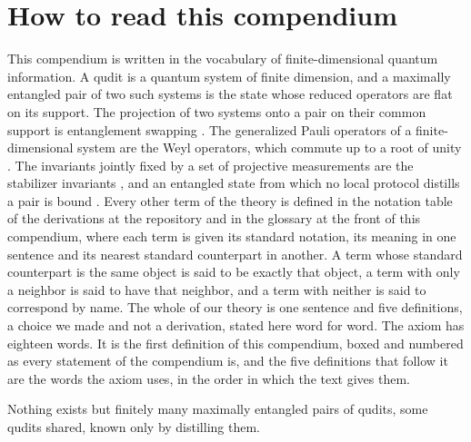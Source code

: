 \section{How to read this compendium}\label{mod:FRAMEWORK}
This compendium is written in the vocabulary of finite-dimensional quantum information. A qudit is a quantum system of finite dimension, and a maximally entangled pair of two such systems is the state whose reduced operators are flat on its support. The projection of two systems onto a pair on their common support is entanglement swapping \cite{Zukowski1993}. The generalized Pauli operators of a finite-dimensional system are the Weyl operators, which commute up to a root of unity \cite{Weyl1927}. The invariants jointly fixed by a set of projective measurements are the stabilizer invariants \cite{Gottesman1997}, and an entangled state from which no local protocol distills a pair is bound \cite{Horodecki1998}. Every other term of the theory is defined in the notation table of the derivations at the repository and in the glossary at the front of this compendium, where each term is given its standard notation, its meaning in one sentence and its nearest standard counterpart in another. A term whose standard counterpart is the same object is said to be exactly that object, a term with only a neighbor is said to have that neighbor, and a term with neither is said to correspond by name.
The whole of our theory is one sentence and five definitions, a choice we made and not a derivation, stated here word for word. The axiom has eighteen words. It is the first definition of this compendium, boxed and numbered as every statement of the compendium is, and the five definitions that follow it are the words the axiom uses, in the order in which the text gives them.
\begin{chdefinition}\label{box:FRAMEWORK:1}\label{def:axiom}
Nothing exists but finitely many maximally entangled pairs of qudits, some qudits shared, known only by distilling them.
\end{chdefinition}
